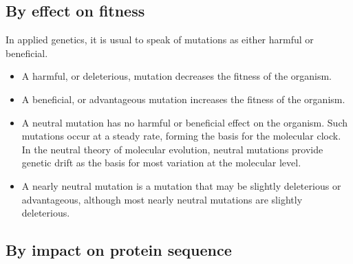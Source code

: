 \hypertarget{by-effect-on-fitness}{%
\subsection{By effect on fitness}\label{by-effect-on-fitness}}

In applied genetics, it is usual to speak of mutations as either harmful or beneficial.

\begin{itemize}
\tightlist
\item
  A harmful, or deleterious, mutation decreases the fitness of the organism.
\item
  A beneficial, or advantageous mutation increases the fitness of the organism.
\item
  A neutral mutation has no harmful or beneficial effect on the organism. Such mutations occur at a steady rate, forming the basis for the molecular clock. In the neutral theory of molecular evolution, neutral mutations provide genetic drift as the basis for most variation at the molecular level.
\item
  A nearly neutral mutation is a mutation that may be slightly deleterious or advantageous, although most nearly neutral mutations are slightly deleterious.
\end{itemize}

\hypertarget{by-impact-on-protein-sequence}{%
\subsection{By impact on protein sequence}\label{by-impact-on-protein-sequence}}

